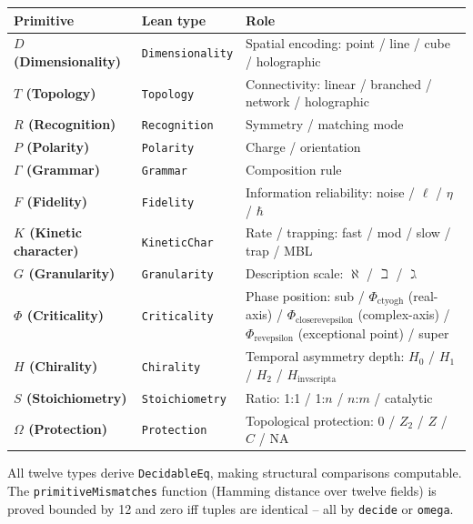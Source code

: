 \documentclass[12pt,a4paper]{article}
\begin{document}
\begin{table}[htbp]
\centering
\small
{}
\begin{tabularx}{\textwidth}{>{\centering\arraybackslash}X >{\centering\arraybackslash}X >{\centering\arraybackslash}X}
\toprule
\rowcolor{gray!25}\textbf{Primitive} & \textbf{Lean type} & \textbf{Role} \\
\midrule
\rowcolors{1}{white}{gray!10}
\textbf{$D$ (Dimensionality)} & \texttt{Dimensionality} & Spatial encoding: point / line / cube / holographic \\
\textbf{$T$ (Topology)} & \texttt{Topology} & Connectivity: linear / branched / network / holographic \\
\textbf{$R$ (Recognition)} & \texttt{Recognition} & Symmetry / matching mode \\
\textbf{$P$ (Polarity)} & \texttt{Polarity} & Charge / orientation \\
\textbf{$\Gamma$ (Grammar)} & \texttt{Grammar} & Composition rule \\
\textbf{$F$ (Fidelity)} & \texttt{Fidelity} & Information reliability: noise / $\ell$ / $\eta$ / $\hbar$ \\
\textbf{$K$ (Kinetic character)} & \texttt{KineticChar} & Rate / trapping: fast / mod / slow / trap / MBL \\
\textbf{$G$ (Granularity)} & \texttt{Granularity} & Description scale: $\aleph$ / $\beth$ / $\gimel$ \\
\textbf{$\Phi$ (Criticality)} & \texttt{Criticality} & Phase position: sub / $\Phi_{\text{ctyogh}}$ (real-axis) / $\Phi_{\text{closerevepsilon}}$ (complex-axis) / $\Phi_{\text{revepsilon}}$ (exceptional point) / super \\
\textbf{$H$ (Chirality)} & \texttt{Chirality} & Temporal asymmetry depth: $H_0$ / $H_1$ / $H_2$ / $H_{\text{invscripta}}$ \\
\textbf{$S$ (Stoichiometry)} & \texttt{Stoichiometry} & Ratio: 1:1 / 1:$n$ / $n$:$m$ / catalytic \\
\textbf{$\Omega$ (Protection)} & \texttt{Protection} & Topological protection: $0$ / $Z_2$ / $Z$ / $C$ / NA \\
\bottomrule
\end{tabularx}
\end{table}

All twelve types derive \texttt{DecidableEq}, making structural comparisons computable. The \texttt{primitiveMismatches} function (Hamming distance over twelve fields) is proved bounded by 12 and zero iff tuples are identical  --  all by \texttt{decide} or \texttt{omega}.
\end{document}
